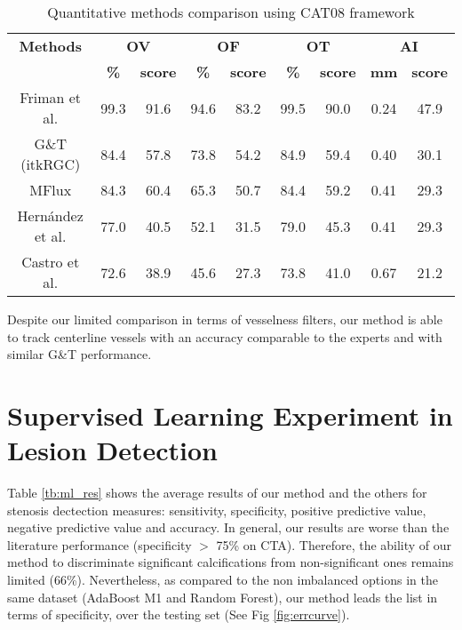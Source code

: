 \begin{table*}[h]
\scriptsize
\caption{Quantitative methods comparison using CAT08 framework}
\centering
\begin{tabular}{|c|cc|cc|cc|cc|}
\hline
\multicolumn{1}{|c|}{\textbf{Methods}} &\multicolumn{2}{c|}{\textbf{OV}} &\multicolumn{2}{c|}{\textbf{OF}} &\multicolumn{2}{c|}{\textbf{OT}}&\multicolumn{2}{c|}{\textbf{AI}}\\
\multicolumn{1}{|c|}{\textbf{}} &\multicolumn{1}{c|}{\textbf{\%}} &\multicolumn{1}{c|}{\textbf{score}} &\multicolumn{1}{c|}{\textbf{\%}} &\multicolumn{1}{c|}{\textbf{score}} &\multicolumn{1}{c|}{\textbf{\%}} &\multicolumn{1}{c|}{\textbf{score}}&\multicolumn{1}{c|}{\textbf{mm}} &\multicolumn{1}{c|}{\textbf{score}}\\
\hline
Friman et al.&99.3 &91.6& 94.6 &83.2 &99.5 & 90.0 &0.24 &47.9\\
G\&T (itkRGC)&84.4&57.8&73.8&54.2&84.9&59.4&0.40&30.1\\
MFlux&84.3&60.4&65.3&50.7&84.4&59.2&0.41&29.3\\
Hern\'andez et al. &77.0& 40.5 &52.1 &31.5 & 79.0 &45.3 &0.41 &29.3 \\
Castro et al.&72.6 &38.9 &45.6 &27.3 &73.8 & 41.0 &0.67 &21.2\\
\hline
\end{tabular}
\vspace{-0.3cm}
\label{tb:tb_4_7}
\normalsize
\end{table*}

Despite our limited comparison in terms of vesselness filters, our method is able to track centerline vessels with an accuracy comparable to the experts and with similar G\&T performance.

\section{Supervised Learning Experiment in Lesion Detection}

Table \ref{tb:ml_res} shows the average results of our method and the others for stenosis dectection measures: sensitivity, specificity, positive predictive value, negative predictive value and accuracy. In general, our results are
worse than the literature performance \citep{Mittal2010,Zuluaga2011a}(specificity $>$ 75\% on CTA). Therefore, the ability of our method to discriminate significant calcifications from non-significant ones remains  limited (66\%). Nevertheless, as compared to the non imbalanced options in the same dataset (AdaBoost M1 and Random Forest), our method leads the list in terms of specificity, over the testing set (See Fig \ref{fig:errcurve}).

